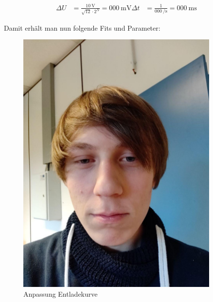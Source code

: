 \documentclass[12pt,twoside,a4paper]{scrartcl}
\begin{document}
				\begin{align}
					\label{Kondensator::Messfehler}
					\Delta U &= \frac{\SI{10}{\volt}}{\sqrt{12} \cdot 2^{N}} = \SI{000}{\milli \volt}
					\Delta t &= \frac{1}{\SI{000}{\per \second}} =  \SI{000}{\milli \second} %
				\end{align}

				Damit erhält man nun folgende Fits und Parameter:

				\begin{figure}[H]
					\centering
					\begin{minipage}{0.4 \textwidth}
						\includegraphics[width = 0.9\textwidth]{Pictures/Platzhalter.jpg}
						\caption{Anpassung Entladekurve}
					\end{minipage}
					\begin{minipage}{0.4 \textwidth}

\end{minipage}
\end{figure}
\end{document}
